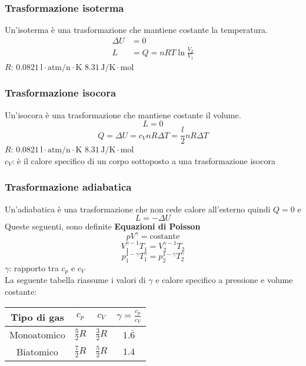\subsubsection{Trasformazione isoterma}
Un'isoterma è una trasformazione che mantiene costante la temperatura.
\begin{align*}
  \Delta U &= 0\\
  L &= Q = nRT\ln\frac{V_2}{V_1}
\end{align*}
\hyperref[tab:R]{$R$}: $0.0821\,\text{l}\cdot\text{atm/n}\cdot\text{K}$
$8.31\,\text{J/K}\cdot\text{mol}$\\

\subsubsection{Trasformazione isocora}
Un'isocora è una trasformazione che mantiene costante il volume.
\begin{equation*}
  L = 0
\end{equation*}
\begin{equation*}
  Q = \Delta U = c_VnR\Delta T =\frac{l}{2}nR\Delta T
\end{equation*}
\hyperref[tab:R]{$R$}: $0.0821\,\text{l}\cdot\text{atm/n}\cdot\text{K}$
$8.31\,\text{J/K}\cdot\text{mol}$\\
$c_V$: è il calore specifico di un corpo sottoposto a una trasformazione isocora


\subsubsection{Trasformazione adiabatica}
Un'adiabatica è una trasformazione che non cede calore all'esterno quindi $Q=0$ e
\begin{equation*}
  L = -\Delta U
\end{equation*}
Queste seguenti, sono definite \textbf{Equazioni di Poisson}
\begin{equation*}
  pV^\gamma = \text{costante}
\end{equation*}
\begin{equation*}
  V_1^{\gamma-1}T_1 = V_2^{\gamma-1}T_2
\end{equation*}
\begin{equation*}
  p_1^{1-\gamma}T_1^\gamma = p_2^{1-\gamma}T_2^\gamma
\end{equation*}
$\gamma$: rapporto tra $c_p$ e $c_V$\\ [\baselineskip] 
La seguente tabella riassume i valori di $\gamma$ e calore specifico a pressione e volume costante:
\begin{center}
  \begin{tabular}{c | c | c | c}
    Tipo di gas & $c_p$ & $c_V$ & $\gamma=\frac{c_p}{c_V}$\\ \hline
    Monoatomico & $\frac{5}{2}R$ & $\frac{3}{2}R$ & $1.\bar{6}$\\ \hline
    Biatomico & $\frac{7}{2}R$ & $\frac{5}{2}R$ & $1.4$\\
  \end{tabular}
\end{center}

